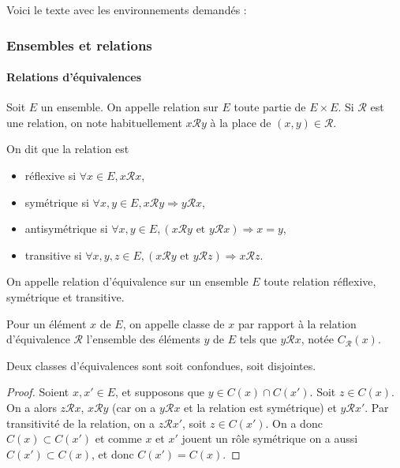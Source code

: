 Voici le texte avec les environnements demandés :

\subsubsection{Ensembles et relations}

\paragraph{Relations d'équivalences}

\begin{de}
Soit $E$ un ensemble. On appelle relation sur $E$ toute
partie de $E \times E$. Si $\mathcal{R}$ est une relation, on note habituellement $x\mathcal{R}y$ à la
place de $(x,y) \in\mathcal{R}$.

On dit que la relation est

\begin{itemize}
\itemsep1pt\parskip0pt
\item
  réflexive si $\forall x \in E, x\mathcal{R}x$,
\item
  symétrique si $\forall x,y \in E, x\mathcal{R}y \Rightarrow y\mathcal{R}x$,
\item
  antisymétrique si $\forall x,y \in E, (x\mathcal{R}y\text{ et } y\mathcal{R}x) \Rightarrow x = y$,
\item
  transitive si $\forall x,y,z \in E, (x\mathcal{R}y\text{ et } y\mathcal{R}z) \Rightarrow x\mathcal{R}z$.
\end{itemize}
\end{de}

\begin{de}
On appelle relation d'équivalence sur un ensemble $E$
toute relation réflexive, symétrique et transitive.
\end{de}

\begin{de}
Pour un élément $x$ de $E$, on appelle classe de $x$ par
rapport à la relation d'équivalence $\mathcal{R}$ l'ensemble des éléments $y$ de $E$
tels que $y\mathcal{R}x$, notée $C_{\mathcal{R}}(x)$.
\end{de}

\begin{prop}
Deux classes d'équivalences sont soit confondues, soit
disjointes.
\end{prop}

\begin{proof}
Soient $x,x' \in E$, et supposons que $y \in C(x) \cap C(x')$. Soit $z \in C(x)$. On a alors $z\mathcal{R}x$, $x\mathcal{R}y$ (car on a $y\mathcal{R}x$ et la relation est symétrique)
et $y\mathcal{R}x'$. Par transitivité de la relation, on a $z\mathcal{R}x'$, soit $z \in C(x')$. On a
donc $C(x) \subset C(x')$ et comme $x$ et $x'$ jouent un rôle symétrique on a aussi
$C(x') \subset C(x)$, et donc $C(x') = C(x)$.
\end{proof}

